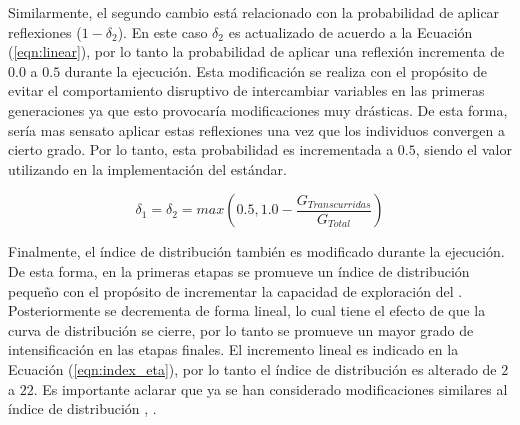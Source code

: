 Similarmente, el segundo cambio está relacionado con la probabilidad de aplicar reflexiones ($1 - \delta_2$).
%
En este caso $\delta_2$ es actualizado de acuerdo a la Ecuación (\ref{eqn:linear}), por lo tanto la probabilidad de aplicar una reflexión incrementa de $0.0$ a $0.5$ durante la ejecución.
%
Esta modificación se realiza con el propósito de evitar el comportamiento disruptivo de intercambiar variables en las primeras generaciones ya que esto provocaría modificaciones muy drásticas.
%
De esta forma, sería mas sensato aplicar estas reflexiones una vez que los individuos convergen a cierto grado.
%
Por lo tanto, esta probabilidad es incrementada a $0.5$, siendo el valor utilizando en la implementación del \SBX{} estándar.

\begin{equation}\label{eqn:linear}
	\delta_1 = \delta_2 = max \left (0.5, 1.0 - \frac{G_{Transcurridas}}{G_{Total}} \right )
\end{equation}

Finalmente, el índice de distribución también es modificado durante la ejecución.
%
De esta forma, en la primeras etapas se promueve un índice de distribución pequeño con el propósito de incrementar la capacidad de exploración del \SBX{}.
%
Posteriormente se decrementa de forma lineal, lo cual tiene el efecto de que la curva de distribución se cierre, por lo tanto se promueve un mayor grado de intensificación en las etapas finales.
%
El incremento lineal es indicado en la Ecuación (\ref{eqn:index_eta}), por lo tanto el índice de distribución es alterado de $2$ a $22$.
%
Es importante aclarar que ya se han considerado modificaciones similares al índice de distribución \cite{zitzler1999multiobjective}, \cite{hamdan2012distribution}.
%

